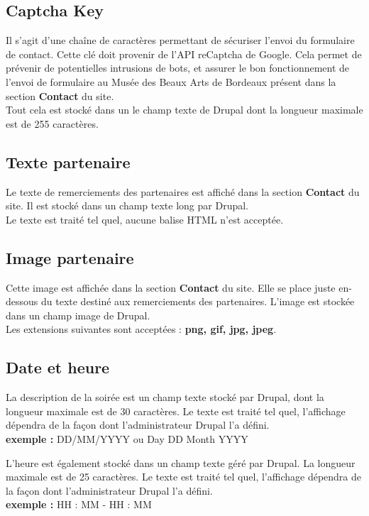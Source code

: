 \documentclass[11pt]{report}
\begin{document}
\subsection{Captcha Key}

Il s'agit d'une chaîne de caractères permettant de sécuriser l'envoi du formulaire
de contact. Cette clé doit provenir de l'API reCaptcha de Google. Cela permet de
prévenir de potentielles intrusions de bots, et assurer le bon fonctionnement
de l'envoi de formulaire au Musée des Beaux Arts de Bordeaux présent dans la
section \textbf{Contact} du site.\\
Tout cela est stocké dans un le champ texte de Drupal dont la longueur maximale
est de 255 caractères.

\subsection{Texte partenaire}

Le texte de remerciements des partenaires est affiché dans la section
\textbf{Contact} du site. Il est stocké dans un champ texte long par Drupal. \\
Le texte est traité tel quel, aucune balise HTML n'est acceptée.

\subsection{Image partenaire}

Cette image est affichée dans la section \textbf{Contact} du site. Elle se place
juste en-dessous du texte destiné aux remerciements des partenaires.
L'image est stockée dans un champ image de Drupal. \\
Les extensions suivantes sont acceptées : \textbf{png, gif, jpg, jpeg}.

\subsection{Date et heure}

La description de la soirée est un champ texte stocké par Drupal, dont la longueur
maximale est de 30 caractères. Le texte est traité tel quel, l'affichage dépendra
de la façon dont l'administrateur Drupal l'a défini. \\
\textbf{exemple :} DD/MM/YYYY ou Day DD Month YYYY


L'heure est également stocké dans un champ texte géré par Drupal. La longueur
maximale est de 25 caractères. Le texte est traité tel quel, l'affichage dépendra
de la façon dont l'administrateur Drupal l'a défini. \\
\textbf{exemple :} HH : MM - HH : MM
\end{document}

